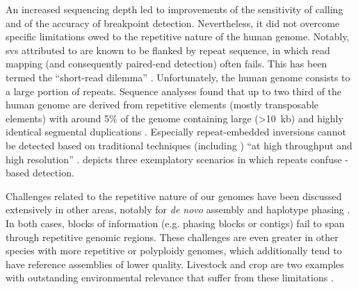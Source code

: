 
An increased sequencing depth led to improvements of the sensitivity of \sv calling
and of the accuracy of breakpoint detection.
Nevertheless, it did not overcome specific limitations owed to the
repetitive nature of the human genome. Notably, \acp{sv} attributed to \nahr are
known to be flanked by repeat sequence, in which read mapping (and consequently
paired-end \sv detection) often fails. This has been termed the ``short-read
dilemma'' \citep{Onishi-Seebacher2011}. Unfortunately, the human genome consists
to a large portion of repeats. Sequence analyses found that up to two third of
the human genome are derived from repetitive elements (mostly transposable
elements) \citep{DeKoning2011} with around 5\% of the genome containing large
(>10~kb) and highly identical segmental duplications \citep{Lander2001}.
Especially repeat-embedded inversions cannot be detected based on traditional
techniques (including \mps) ``at high throughput and high resolution''
\citep{Sanders2016}.  depicts three exemplatory
scenarios in which repeats confuse \mps-based \sv detection.

Challenges related to the repetitive nature of our genomes have been discussed
extensively in other areas, notably for \textit{de novo} assembly \citep{Alkan2011_assembly}
and haplotype phasing \citep{Browning2011}. In both cases, blocks of information
(e.g. phasing blocks or contigs) fail to span through repetitive genomic regions.
These challenges are even greater in other species with more repetitive or
polyploidy genomes, which additionally tend to have reference assemblies of lower
quality. Livestock and crop are two examples with outstanding environmental
relevance that suffer from these limitations \citep{Bickhart2014,Saxena2014}.

